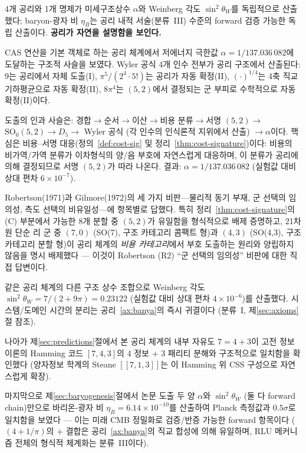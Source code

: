 \documentclass[entropy,article,submit,pdftex,oneauthor]{Definitions/mdpi}
\begin{document}
4개 공리와 1개 명제가 미세구조상수 $\alpha$와 Weinberg 각도 $\sin^2\theta_W$를 독립적으로 산출했다; baryon-광자 비 $\eta_B$는 공리 내적 서술(분류~III) 수준의 forward 검증 가능한 독립 산출이다. \textbf{공리가 자연을 설명함을 보인다.}

CAS 연산을 기본 객체로 하는 공리 체계에서 저에너지 극한값 $\alpha = 1/137.036\,082$에 도달하는 구조적 사슬을 보였다. Wyler 공식 4개 인수 전부가 공리 구조에서 산출된다: $9$는 공리에서 자체 도출(I), $\pi^5/(2^4 \cdot 5!)$는 공리가 자동 확정(II), $(\cdot)^{1/4}$는 4축 직교 기하평균으로 자동 확정(II), $8\pi^4$는 $(5,2)$에서 결정되는 군 부피로 수학적으로 자동 확정(II)이다.

도출의 인과 사슬은: 경합$\to$순서$\to$이산$\to$비용 분류$\to$서명 $(5,2)$$\to$$\mathrm{SO}_0(5,2) \to D_5 \to$ Wyler 공식 (각 인수의 인식론적 지위에서 산출) $\to \alpha$이다. 핵심은 비용--서명 대응(정의~\ref{def:cost-sig} 및 정리~\ref{thm:cost-signature})이다: 비용의 비가역/가역 분류가 이차형식의 양/음 부호에 자연스럽게 대응하며, 이 분류가 공리에 의해 결정되므로 서명 $(5,2)$가 따라 나온다. 결과: $\alpha = 1/137.036\,082$ (실험값 대비 상대 편차 $6 \times 10^{-7}$).

Robertson(1971)과 Gilmore(1972)의 세 가지 비판---물리적 동기 부재, 군 선택의 임의성, 측도 선택의 비유일성---에 항목별로 답했다. 특히 정리~\ref{thm:cost-signature}의 (C) 부분에서 가능한 8개 분할 중 $(5,2)$가 유일함을 형식적으로 배제 증명하고, 21차원 단순 리 군 중 $(7,0)$ (SO(7), 구조 카테고리 콤팩트 형)과 $(4,3)$ (SO(4,3), 구조 카테고리 분할 형)이 공리 체계의 \emph{비용 카테고리}에서 부호 도출하는 원리와 양립하지 않음을 명시 배제했다 — 이것이 Robertson (R2) ``군 선택의 임의성'' 비판에 대한 직접 답변이다.

같은 공리 체계의 다른 구조 상수 조합으로 Weinberg 각도 $\sin^2\theta_W = 7/(2+9\pi) = 0.23122$ (실험값 대비 상대 편차 $4 \times 10^{-6}$)를 산출했다. 시스템/도메인 시간의 분리는 공리~\ref{ax:banya}의 즉시 귀결이다 (분류~I, 제\ref{sec:axioms}절 참조).

나아가 제\ref{sec:predictions}절에서 본 공리 체계의 내부 자유도 $7 = 4 + 3$이 고전 정보이론의 Hamming 코드 $[7,4,3]$의 4 정보 + 3 패리티 분해와 구조적으로 일치함을 확인했다 (양자정보 학계의 Steane $[[7,1,3]]$는 이 Hamming 위 CSS 구성으로 자연스럽게 확장).

마지막으로 제\ref{sec:baryogenesis}절에서 논문 도출 두 양 $\alpha$와 $\sin^2\theta_W$ (둘 다 forward chain)만으로 바리온-광자 비 $\eta_B = 6.14 \times 10^{-10}$를 산출하여 Planck 측정값과 $0.5\sigma$로 일치함을 보였다 — 이는 미래 CMB 정밀화로 검증/반증 가능한 forward 항목이다 ($(4+1/\pi)$의 $+$ 결합은 공리~\ref{ax:banya}의 직교 합성에 의해 유일하며, RLU 메커니즘 전체의 형식적 체계화는 분류~III이다).
\end{document}
